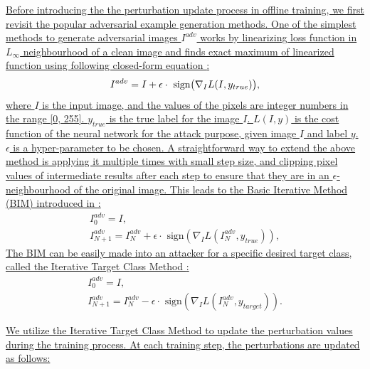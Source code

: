 \documentclass[12pt]{article}
\begin{document}
\uline{Before introducing the the perturbation update process in offline training, we first revisit the popular adversarial example generation methods. One of the simplest methods to generate adversarial images $I^{adv}$ works by linearizing loss function in $L_{\infty}$ neighbourhood of a clean image and finds exact maximum of linearized function using following closed-form equation \cite{FGSM}:}
\begin{equation}
    I^{adv} = I + \epsilon \cdot \text{ sign} \bigl( \nabla_I L(I, y_{true})  \bigr),
    \vspace{-0.1cm}
\end{equation}
\uline{where $I$ is the input image, and the values of the pixels are integer numbers in the range [0, 255]. $y_{true}$ is the true label for the image $I$. $L(I, y)$ is the cost function of the neural network for the attack purpose, given image $I$ and label $y$. $\epsilon$ is a hyper-parameter to be chosen. A straightforward way to extend the above method is applying it multiple times with small step size, and clipping pixel values of intermediate results after each step to ensure that they are in an $\epsilon$-neighbourhood of the original image.  This leads to the Basic Iterative Method (BIM) introduced in \cite{kurakin2017adversarial}:}
\begin{equation}
    \begin{gathered}
        I_0^{adv} = I, \\
        I_{N+1}^{adv} = I_N^{adv}+\epsilon \cdot \text{ sign}(\nabla_I L(I_N^{adv},y_{true})),
    \end{gathered}
\end{equation}
\uline{The BIM can be easily made into an attacker for a specific desired target class, called the Iterative Target Class Method \cite{kurakin2017adversarial}:}
\begin{equation}
  \begin{gathered}
      I_0^{adv} = I,\\
      I_{N+1}^{adv} = I_N^{adv}-\epsilon \cdot \text{ sign}(\nabla_I L(I_N^{adv},y_{target})).
  \end{gathered}
  \label{equ:itcm}
\end{equation}

\uline{
We utilize the Iterative Target Class Method to update the perturbation values during the training process. At each training step, the perturbations are updated as follows:}
\end{document}
